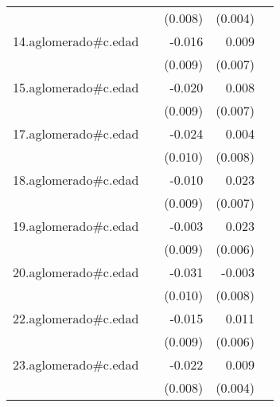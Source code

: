{\begin{longtable}{l*{4}{D{.}{.}{-1}}}
            &                     &     (0.008)         &     (0.004)         &                     \\
\addlinespace
14.aglomerado#c.edad&                     &      -0.016         &       0.009         &                     \\
            &                     &     (0.009)         &     (0.007)         &                     \\
\addlinespace
15.aglomerado#c.edad&                     &      -0.020\sym{*}  &       0.008         &                     \\
            &                     &     (0.009)         &     (0.007)         &                     \\
\addlinespace
17.aglomerado#c.edad&                     &      -0.024\sym{*}  &       0.004         &                     \\
            &                     &     (0.010)         &     (0.008)         &                     \\
\addlinespace
18.aglomerado#c.edad&                     &      -0.010         &       0.023\sym{***}&                     \\
            &                     &     (0.009)         &     (0.007)         &                     \\
\addlinespace
19.aglomerado#c.edad&                     &      -0.003         &       0.023\sym{***}&                     \\
            &                     &     (0.009)         &     (0.006)         &                     \\
\addlinespace
20.aglomerado#c.edad&                     &      -0.031\sym{**} &      -0.003         &                     \\
            &                     &     (0.010)         &     (0.008)         &                     \\
\addlinespace
22.aglomerado#c.edad&                     &      -0.015         &       0.011         &                     \\
            &                     &     (0.009)         &     (0.006)         &                     \\
\addlinespace
23.aglomerado#c.edad&                     &      -0.022\sym{**} &       0.009\sym{*}  &                     \\
            &                     &     (0.008)         &     (0.004)         &                     \\

\end{longtable}}

